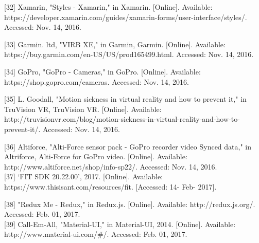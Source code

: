 \documentclass[10pt,draftclsnofoot,onecolumn]{IEEEtran}
\begin{document}
[32] Xamarin, "Styles - Xamarin," in Xamarin. [Online]. Available: https://developer.xamarin.com/guides/xamarin-forms/user-interface/styles/. Accessed: Nov. 14, 2016.\\
 \vspace{2mm}


[33] Garmin. ltd, "VIRB XE," in Garmin, Garmin. [Online]. Available: https://buy.garmin.com/en-US/US/prod165499.html. Accessed: Nov. 14, 2016.\\
 \vspace{2mm}


[34] GoPro, "GoPro - Cameras," in GoPro. [Online]. Available: https://shop.gopro.com/cameras. Accessed: Nov. 14, 2016.\\
 \vspace{2mm}


[35] L. Goodall, "Motion sickness in virtual reality and how to prevent it," in TruVision VR, TruVision VR. [Online]. Available: http://truvisionvr.com/blog/motion-sickness-in-virtual-reality-and-how-to-prevent-it/. Accessed: Nov. 14, 2016.\\
 \vspace{2mm}


[36] Altiforce, "Alti-Force sensor pack - GoPro recorder video Synced data," in Altriforce, Alti-Force for GoPro video. [Online]. Available: http://www.altiforce.net/shop/info-sp22/. Accessed: Nov. 14, 2016.\\
 \vspace{2mm}
 [37] ‘FIT SDK 20.22.00’, 2017. [Online]. Available:
https://www.thisisant.com/resources/fit. [Accessed: 14- Feb- 2017].
\vspace{2mm}

[38] "Redux Me - Redux," in Redux.js. [Online]. Available: http://redux.js.org/. Accessed: Feb. 01, 2017.\\
\vspace{2mm}
[39] Call-Em-All, "Material-UI," in Material-UI, 2014. [Online]. Available: http://www.material-ui.com/#/. Accessed: Feb. 01, 2017.
\end{document}
